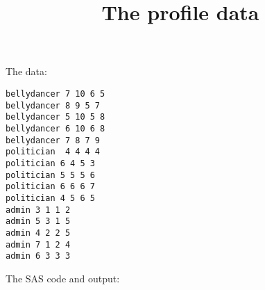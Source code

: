 \documentclass{article}
\title{The profile data}
\begin{document}
\maketitle
The data:
\begin{verbatim}
bellydancer 7 10 6 5 
bellydancer 8 9 5 7 
bellydancer 5 10 5 8 
bellydancer 6 10 6 8 
bellydancer 7 8 7 9 
politician  4 4 4 4 
politician 6 4 5 3 
politician 5 5 5 6  
politician 6 6 6 7  
politician 4 5 6 5 
admin 3 1 1 2 
admin 5 3 1 5 
admin 4 2 2 5 
admin 7 1 2 4 
admin 6 3 3 3 
\end{verbatim}
The SAS code and output:
\end{document}
